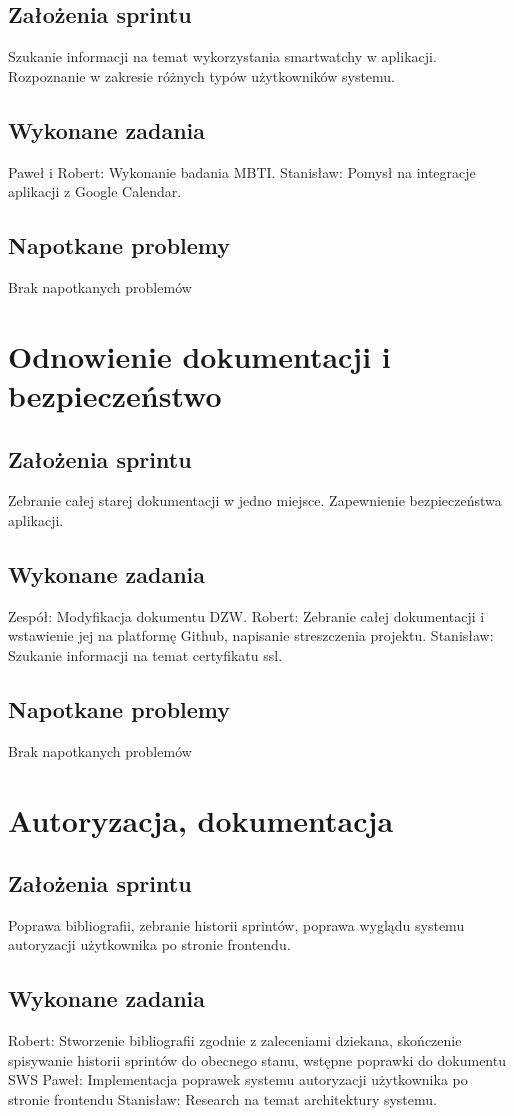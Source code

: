 \documentclass[a4paper,11pt]{report}
\begin{document}
\subsection {Założenia sprintu}
Szukanie informacji na temat wykorzystania smartwatchy w aplikacji. Rozpoznanie w zakresie różnych typów użytkowników systemu. 
\subsection {Wykonane zadania}
Paweł i Robert: Wykonanie badania MBTI.
Stanisław: Pomysł na integracje aplikacji z Google Calendar.
\subsection {Napotkane problemy}
Brak napotkanych problemów

\section {Odnowienie dokumentacji i bezpieczeństwo}
\subsection {Założenia sprintu}
Zebranie całej starej dokumentacji w jedno miejsce. Zapewnienie bezpieczeństwa aplikacji.  
\subsection {Wykonane zadania}
Zespół: Modyfikacja dokumentu DZW.
Robert: Zebranie całej dokumentacji i wstawienie jej na platformę Github, napisanie streszczenia projektu.
Stanisław: Szukanie informacji na temat certyfikatu ssl.
\subsection {Napotkane problemy}
Brak napotkanych problemów

\section {Autoryzacja, dokumentacja}
\subsection {Założenia sprintu}
Poprawa bibliografii, zebranie historii sprintów, poprawa wyglądu systemu autoryzacji użytkownika po stronie frontendu.
\subsection {Wykonane zadania}
Robert: Stworzenie bibliografii zgodnie z zaleceniami dziekana, skończenie spisywanie historii sprintów do obecnego stanu, wstępne poprawki do dokumentu SWS
Paweł: Implementacja poprawek systemu autoryzacji użytkownika po stronie frontendu
Stanisław: Research na temat architektury systemu.
\end{document}
